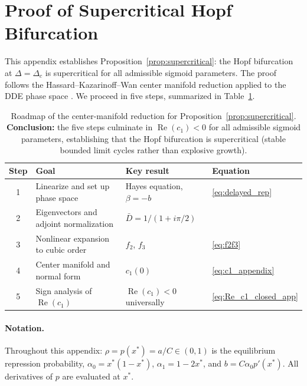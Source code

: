 \section{Proof of Supercritical Hopf Bifurcation}
\label{app:hopf_proof}

This appendix establishes Proposition~\ref{prop:supercritical}: the Hopf bifurcation at $\Delta=\Delta_c$ is supercritical for all admissible sigmoid parameters. The proof follows the Hassard--Kazarinoff--Wan center manifold reduction \citep{hassard1981theory} applied to the DDE phase space \citep{hale1993introduction}. We proceed in five steps, summarized in Table~\ref{tab:proof_roadmap}.

\begin{table}[ht]
\centering
\begin{tabular}{clll}
\toprule
Step & Goal & Key result & Equation \\
\midrule
1 & Linearize and set up phase space & Hayes equation, $\beta=-b$ & \eqref{eq:delayed_rep} \\
2 & Eigenvectors and adjoint normalization & $\bar{D}=1/(1+i\pi/2)$ & \\
3 & Nonlinear expansion to cubic order & $f_2$, $f_3$ & \eqref{eq:f2f3} \\
4 & Center manifold and normal form & $c_1(0)$ & \eqref{eq:c1_appendix} \\
5 & Sign analysis of $\operatorname{Re}(c_1)$ & $\operatorname{Re}(c_1)<0$ universally & \eqref{eq:Re_c1_closed_app} \\
\bottomrule
\end{tabular}
\caption{Roadmap of the center-manifold reduction for Proposition~\ref{prop:supercritical}. \textbf{Conclusion:} the five steps culminate in $\operatorname{Re}(c_1)<0$ for all admissible sigmoid parameters, establishing that the Hopf bifurcation is supercritical (stable bounded limit cycles rather than explosive growth).}
\label{tab:proof_roadmap}
\end{table}

\paragraph{Notation.} Throughout this appendix: $\rho = p(x^*) = a/C \in (0,1)$ is the equilibrium repression probability, $\alpha_0 = x^*(1-x^*)$, $\alpha_1 = 1-2x^*$, and $b = C\alpha_0 p'(x^*)$. All derivatives of $p$ are evaluated at $x^*$.

